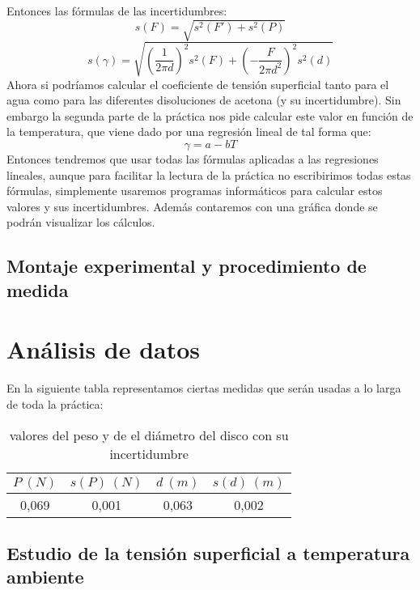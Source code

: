 \documentclass[10pt,a4paper]{article}
\begin{document}
Entonces las fórmulas de las incertidumbres:
\begin{equation}
s(F)=\sqrt{s^2(F')+s^2(P)}
\label{inceridumbre F}
\end{equation}
\begin{equation}
s(\gamma)=\sqrt{(\dfrac{1}{2 \pi d})^2s^2(F)+(-\dfrac{F}{2\pi d^2})^2s^2(d)}
\label{incertidumbre gamma}
\end{equation}
Ahora si podríamos calcular el coeficiente de tensión superficial tanto para el agua como para las diferentes disoluciones de acetona (y su incertidumbre). Sin embargo la segunda parte de la práctica nos pide calcular este valor en función de la temperatura, que viene dado por una regresión lineal de tal forma que: 
\begin{equation}
\gamma=a - bT \label{regresion lineal}
\end{equation}
Entonces tendremos que usar todas las fórmulas aplicadas a las regresiones lineales, aunque para facilitar la lectura de la práctica no escribirimos todas estas fórmulas, simplemente usaremos programas informáticos para calcular estos valores y sus incertidumbres. Además contaremos con una gráfica donde se podrán visualizar los cálculos.
\subsection{Montaje experimental y procedimiento de medida}
\section{Análisis de datos}
En la siguiente tabla representamos ciertas medidas que serán usadas a lo larga de toda la práctica:

\begin{table}[h]
\begin{center}
\begin{tabular}{|c|c|c|c|} \hline
$P  \ (N)$ & $s(P) \ (N)$ & $d \ (m)$ & $s(d) \ (m)$ 
  \\ \hline
0,069  & 0,001 & 0,063  & 0,002 
  \\  \hline
\end{tabular}
\caption{valores del peso y de el diámetro del disco con su incertidumbre}
\label{tab:masa y peso}
\end{center}
\end{table}

\subsection{Estudio de la tensión superficial a temperatura ambiente}
\end{document}
